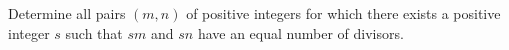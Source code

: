 Determine all pairs $(m, n)$ of positive integers for which there exists a positive integer $s$ such that $sm$ and $sn$ have an equal number of divisors.
